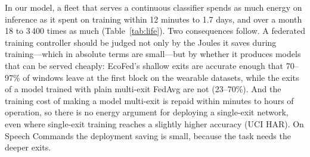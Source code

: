 In our model, a fleet that serves a continuous classifier spends as much energy on inference as it spent on training within 12 minutes to 1.7 days, and over a month 18 to 3\,400 times as much (Table~\ref{tab:life}). Two consequences follow. A federated training controller should be judged not only by the Joules it saves during training---which in absolute terms are small---but by whether it produces models that can be served cheaply: EcoFed's shallow exits are accurate enough that 70--97\% of windows leave at the first block on the wearable datasets, while the exits of a model trained with plain multi-exit FedAvg are not (23--70\%). And the training cost of making a model multi-exit is repaid within minutes to hours of operation, so there is no energy argument for deploying a single-exit network, even where single-exit training reaches a slightly higher accuracy (UCI HAR). On Speech Commands the deployment saving is small, because the task needs the deeper exits.
